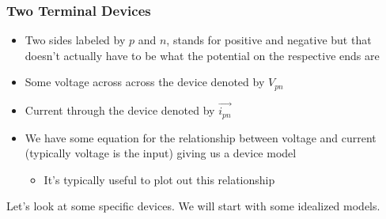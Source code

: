 \documentclass{report}
\begin{document}
\subsubsection{Two Terminal Devices}
\begin{itemize}
    \item Two sides labeled by $p$ and $n$, stands for positive and negative but that doesn't actually have to be what the potential on the respective ends are
    \item Some voltage across across the device denoted by $V_{pn}$
    \item Current through the device denoted by $\vec{i_{pn}}$
    \item We have some equation for the relationship between voltage and current (typically voltage is the input) giving us a device model
    \begin{itemize}
        \item It's typically useful to plot out this relationship
    \end{itemize}
\end{itemize}
Let's look at some specific devices. We will start with some idealized models.
\end{document}
